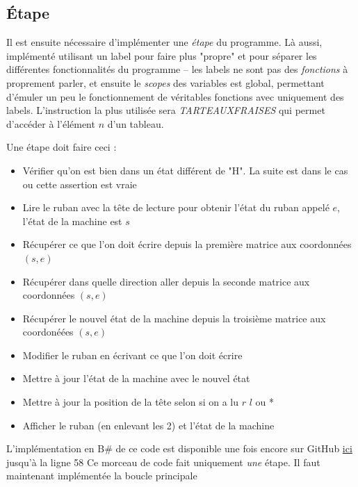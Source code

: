 \documentclass[11pt,colorlinks=true,a4paper]{article}
\newcommand{\bs}{B\# }
\begin{document}
    \subsection{Étape}
    Il est ensuite nécessaire d'implémenter une \textit{étape} du programme. Là aussi, implémenté utilisant un label pour faire plus "propre" et pour séparer 
    les différentes fonctionnalités du programme -- les labels ne sont pas des \textit{fonctions} à proprement parler, et ensuite le \textit{scopes} des variables 
    est global, permettant d'émuler un peu le fonctionnement de véritables fonctions avec uniquement des labels. L'instruction la plus utilisée sera 
    \textit{TARTEAUXFRAISES} qui permet d'accéder à l'élément $n$ d'un tableau.\par 
    \bigskip 
    Une étape doit faire ceci : 
    \begin{itemize}
        \item Vérifier qu'on est bien dans un état différent de "H". La suite est dans le cas ou cette assertion est vraie
        \item Lire le ruban avec la tête de lecture pour obtenir l'état du ruban appelé $e$, l'état de la machine est $s$ 
        \item Récupérer ce que l'on doit écrire depuis la première matrice aux coordonnées $(s,e)$
        \item Récupérer dans quelle direction aller depuis la seconde matrice aux coordonnées $(s,e)$
        \item Récupérer le nouvel état de la machine depuis la troisième matrice aux coordonéées $(s,e)$
        \item Modifier le ruban en écrivant ce que l'on doit écrire 
        \item Mettre à jour l'état de la machine avec le nouvel état 
        \item Mettre à jour la position de la tête selon si on a lu $r$ $l$ ou * 
        \item Afficher le ruban (en enlevant les 2) et l'état de la machine
    \end{itemize} 
    L'implémentation en \bs de ce code est disponible une fois encore sur GitHub \href{https://github.com/coco33920/ocaml-baguettesharp-interpreter/blob/master/examples/turing.baguette#L26}{ici} jusqu'à la ligne 58
    Ce morceau de code fait uniquement \textit{une} étape. Il faut maintenant implémentée la boucle principale
\end{document}

